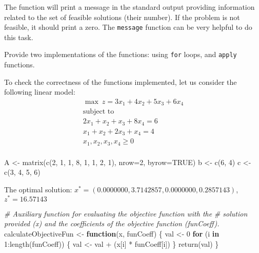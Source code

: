 \documentclass[
]{article}
\newenvironment{Shaded}{\begin{snugshade}}{\end{snugshade}}
\newcommand{\AttributeTok}[1]{\textcolor[rgb]{0.77,0.63,0.00}{#1}}
\newcommand{\CommentTok}[1]{\textcolor[rgb]{0.56,0.35,0.01}{\textit{#1}}}
\newcommand{\ConstantTok}[1]{\textcolor[rgb]{0.00,0.00,0.00}{#1}}
\newcommand{\ControlFlowTok}[1]{\textcolor[rgb]{0.13,0.29,0.53}{\textbf{#1}}}
\newcommand{\DecValTok}[1]{\textcolor[rgb]{0.00,0.00,0.81}{#1}}
\newcommand{\FunctionTok}[1]{\textcolor[rgb]{0.00,0.00,0.00}{#1}}
\newcommand{\NormalTok}[1]{#1}
\newcommand{\OtherTok}[1]{\textcolor[rgb]{0.56,0.35,0.01}{#1}}
\newcommand{\SpecialCharTok}[1]{\textcolor[rgb]{0.00,0.00,0.00}{#1}}
\begin{document}
The function will print a message in the standard output providing
information related to the set of feasible solutions (their number). If
the problem is not feasible, it should print a zero. The
\texttt{message} function can be very helpful to do this task.

Provide two implementations of the functions: using \texttt{for} loops,
and \texttt{apply} functions.

To check the correctness of the functions implemented, let us consider
the following linear model: \[
\begin{array}{r}
\max\ z=3x_{1}+4x_{2}+5x_3+6x_4 \\
     \mbox{subject to}\hspace{3cm}\\
      2x_{1}+x_{2}+x_3+8x_4 = 6    \\
      x_{1}+x_{2}+2x_3+x_{4}=4 \\
      x_{1},x_{2},x_{3},x_{4}\geq 0  \\
      \end{array}
\]

\begin{Shaded}
\begin{Highlighting}[]
\NormalTok{A }\OtherTok{\textless{}{-}} \FunctionTok{matrix}\NormalTok{(}\FunctionTok{c}\NormalTok{(}\DecValTok{2}\NormalTok{, }\DecValTok{1}\NormalTok{, }\DecValTok{1}\NormalTok{, }\DecValTok{8}\NormalTok{, }\DecValTok{1}\NormalTok{, }\DecValTok{1}\NormalTok{, }\DecValTok{2}\NormalTok{, }\DecValTok{1}\NormalTok{), }\AttributeTok{nrow=}\DecValTok{2}\NormalTok{, }\AttributeTok{byrow=}\ConstantTok{TRUE}\NormalTok{)}
\NormalTok{b }\OtherTok{\textless{}{-}} \FunctionTok{c}\NormalTok{(}\DecValTok{6}\NormalTok{, }\DecValTok{4}\NormalTok{)}
\NormalTok{c }\OtherTok{\textless{}{-}} \FunctionTok{c}\NormalTok{(}\DecValTok{3}\NormalTok{, }\DecValTok{4}\NormalTok{, }\DecValTok{5}\NormalTok{, }\DecValTok{6}\NormalTok{)}
\end{Highlighting}
\end{Shaded}

The optimal solution:
\(x^*=(0.0000000, 3.7142857, 0.0000000, 0.2857143)\), \(z^*=16.57143\)

\begin{Shaded}
\begin{Highlighting}[]
\CommentTok{\# Auxiliary function for evaluating the objective function with the}
\CommentTok{\# solution provided (x) and the coefficients of the objective function (funCoeff).}
\NormalTok{calculateObjectiveFun }\OtherTok{\textless{}{-}} \ControlFlowTok{function}\NormalTok{(x, funCoeff) \{}
\NormalTok{  val }\OtherTok{\textless{}{-}} \DecValTok{0}
  \ControlFlowTok{for}\NormalTok{ (i }\ControlFlowTok{in} \DecValTok{1}\SpecialCharTok{:}\FunctionTok{length}\NormalTok{(funCoeff)) \{}
\NormalTok{    val }\OtherTok{\textless{}{-}}\NormalTok{ val }\SpecialCharTok{+}\NormalTok{ (x[i] }\SpecialCharTok{*}\NormalTok{ funCoeff[i])}
\NormalTok{  \}}
  \FunctionTok{return}\NormalTok{(val)}
\NormalTok{\}}
\end{Highlighting}
\end{Shaded}
\end{document}
